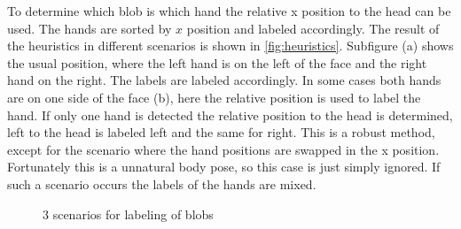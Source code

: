 To determine which blob is which hand the relative x position to the head can be used. The hands are sorted by $x$ position and labeled accordingly. The result of the heuristics in different scenarios is shown in \autoref{fig:heuristics}. Subfigure (a) shows the usual position, where the left hand is on the left of the face and the right hand on the right. The labels are labeled accordingly. In some cases both hands are on one side of the face (b), here the relative position is used to label the hand. If only one hand is detected the relative position to the head is determined, left to the head is labeled left and the same for right. This is a robust method, except for the scenario where the hand positions are swapped in the x position. Fortunately this is a unnatural body pose, so this case is just simply ignored. If such a scenario occurs the labels of the hands are mixed. 

\begin{figure}[tb]
\centering
\hspace{0.02\linewidth}
\hspace{0.02\linewidth}
\hspace{0.02\linewidth}
\caption{3 scenarios for labeling of blobs}
\label{fig:heuristics}
\end{figure}




